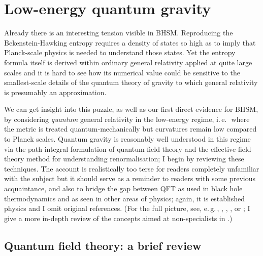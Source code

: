\documentclass{article}
\newcommand{\ie}{\mbox{i.\,e.\,\ }}
\newcommand{\egc}{\mbox{e.\,g.\,}}
\begin{document}
\section{Low-energy quantum gravity}\label{lowenergy}

Already there is an interesting tension visible in BHSM. Reproducing the Bekenstein-Hawking entropy requires a density of states so high as to imply that Planck-scale physics is needed to understand those states. Yet the entropy formula itself is derived within ordinary general relativity applied at quite large scales and it is hard to see how its numerical value could be sensitive to the smallest-scale details of the quantum theory of gravity to which general relativity is presumably an approximation.

We can get insight into this puzzle, as well as our first direct evidence for BHSM, by considering \emph{quantum} general relativity in the low-energy regime, \ie where the metric is treated quantum-mechanically but curvatures remain low compared to Planck scales. Quantum gravity is reasonably well understood in this regime via the path-integral formulation of quantum field theory and the effective-field-theory method for understanding renormalisation; I begin by reviewing these techniques. The account is realistically too terse for readers completely unfamiliar with the subject but it should serve as a reminder to readers with some previous acquaintance, and also to bridge the gap between QFT as used in black hole thermodynamics and as seen in other areas of physics; again, it is established physics and I omit original references. (For the full picture, see, \egc, , , , or ; I give a more in-depth review of the concepts aimed at non-specialists in .)

\subsection{Quantum field theory: a brief review}\label{qftintro}
\end{document}
